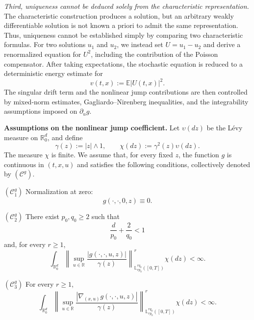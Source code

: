 \documentclass[12pt,oneside, reqno]{amsart}
\def\mL{{\mathbb L}}
\def\geq{\geqslant}
\numberwithin{equation}{section}
\begin{document}
	\medskip
	\noindent
	\emph{Third, uniqueness cannot be deduced solely from the
		characteristic representation.}	The characteristic construction produces a solution, but an arbitrary	weakly differentiable solution is not known a priori to admit the same	representation. Thus, uniqueness cannot be established simply by	comparing two characteristic formulas. For two solutions \(u_1\) and	\(u_2\), we instead set \(U=u_1-u_2\) and derive a renormalized equation	for \(U^2\), including the contribution of the Poisson compensator.
	After taking expectations, the stochastic equation is reduced to a	deterministic energy estimate for
	\begin{equation*}
		v(t,x):=\mathbb{E}|U(t,x)|^2.
	\end{equation*}
	The singular drift term and the nonlinear jump contributions are then controlled by mixed-norm estimates, Gagliardo--Nirenberg inequalities,	and the integrability assumptions imposed on \(\partial_u g\).
	
	\medskip
	\noindent
	\textbf{Assumptions on the nonlinear jump coefficient.}	Let \(\upsilon(dz)\) be the L\'evy measure on	\(\mathbb{R}_0^d\), and define
	\begin{equation*}
		\gamma(z):=|z|\wedge1,
		\qquad
		\chi(dz):=\gamma^2(z)\upsilon(dz).
	\end{equation*}
	The measure \(\chi\) is finite. We assume that, for every fixed \(z\),	the function \(g\) is continuous in \((t,x,u)\) and satisfies the	following conditions, collectively denoted by \((\mathcal C^g)\).
	
	\medskip
	\noindent
	\((\mathcal C_1^g)\) Normalization at zero:
	\begin{equation*}
		g(\cdot,\cdot,0,z)\equiv0.
	\end{equation*}
	
	\noindent
	\((\mathcal C_2^g)\) There exist \(p_0,q_0\geq2\) such that
	\begin{equation*}
		\frac{d}{p_0}+\frac{2}{q_0}<1
	\end{equation*}
	and, for every \(r\geq1\),
	\begin{equation*}
		\int_{\mathbb{R}_0^d}
		\left\|
		\sup_{u\in\mathbb{R}}
		\frac{|g(\cdot,\cdot,u,z)|}{\gamma(z)}
		\right\|_{\mL_{rp_0}^{rq_0}([0,T])}^{r}
		\chi(dz)
		<\infty.
	\end{equation*}
	
	\noindent
	\((\mathcal C_3^g)\) 
	For every \(r\geq1\),
	\begin{equation*}
		\int_{\mathbb{R}_0^d}
		\left\|
		\sup_{u\in\mathbb{R}}
		\frac{
			|\nabla_{(x,u)}g(\cdot,\cdot,u,z)|
		}{
			\gamma(z)
		}
		\right\|_{\mL_{rp_0}^{rq_0}([0,T])}^{r}
		\chi(dz)
		<\infty.
	\end{equation*}
	
\end{document}
